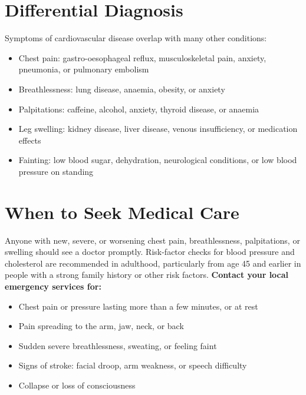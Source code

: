 \section*{Differential Diagnosis}
Symptoms of cardiovascular disease overlap with many other conditions:
\begin{itemize}
    \item Chest pain: gastro-oesophageal reflux, musculoskeletal pain, anxiety, pneumonia, or pulmonary embolism
    \item Breathlessness: lung disease, anaemia, obesity, or anxiety
    \item Palpitations: caffeine, alcohol, anxiety, thyroid disease, or anaemia
    \item Leg swelling: kidney disease, liver disease, venous insufficiency, or medication effects
    \item Fainting: low blood sugar, dehydration, neurological conditions, or low blood pressure on standing
\end{itemize}

\section*{When to Seek Medical Care}
Anyone with new, severe, or worsening chest pain, breathlessness, palpitations, or swelling should see a doctor promptly. Risk-factor checks for blood pressure and cholesterol are recommended in adulthood, particularly from age 45 and earlier in people with a strong family history or other risk factors.
\textbf{Contact your local emergency services for:}
\begin{itemize}
    \item Chest pain or pressure lasting more than a few minutes, or at rest
    \item Pain spreading to the arm, jaw, neck, or back
    \item Sudden severe breathlessness, sweating, or feeling faint
    \item Signs of stroke: facial droop, arm weakness, or speech difficulty
    \item Collapse or loss of consciousness
\end{itemize}

